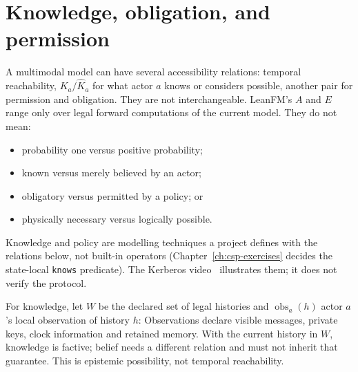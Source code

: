 \section{Knowledge, obligation, and permission}

A multimodal model can have several accessibility relations: temporal reachability,
$K_a/\widehat K_a$ for what actor $a$ knows or considers possible, another pair for
permission and obligation. They are not interchangeable. LeanFM's $A$ and $E$
range only over legal forward computations of the current model. They do not mean:

\begin{itemize}
  \item probability one versus positive probability;
  \item known versus merely believed by an actor;
  \item obligatory versus permitted by a policy; or
  \item physically necessary versus logically possible.
\end{itemize}

Knowledge and policy are modelling techniques a project defines with the relations
below, not built-in operators (Chapter~\ref{ch:csp-exercises} decides the
state-local \texttt{knows} predicate). The Kerberos video~\citep{leanfmKerberosVideo}
illustrates them; it does not verify the protocol.

For knowledge, let $W$ be the declared set of legal histories and
$\operatorname{obs}_a(h)$ actor $a$'s local observation of history $h$:
Observations declare visible messages, private keys, clock information and
retained memory. With the current history in $W$, knowledge is factive; belief needs
a different relation and must not inherit that guarantee.
This is epistemic possibility, not temporal reachability.

